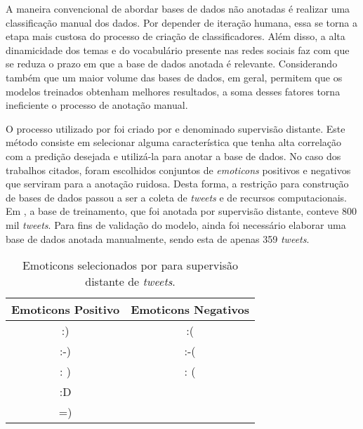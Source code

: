 A maneira convencional de abordar bases de dados não anotadas é realizar uma
classificação manual dos dados.
Por depender de iteração humana, essa se torna a etapa mais custosa do processo
de criação de classificadores.
Além disso, a alta dinamicidade dos temas e do vocabulário presente nas redes
sociais faz com que se reduza o prazo em que a base de dados anotada é
relevante.
Considerando também que um maior volume das bases de dados, em geral, permitem
que os modelos treinados obtenham melhores resultados, a soma desses fatores torna
ineficiente o processo de anotação manual.

O processo utilizado por \citet{go09} foi criado por \citet{read05} e denominado
supervisão distante.
Este método consiste em selecionar alguma característica que tenha alta correlação
com a predição desejada e utilizá-la para anotar a base de dados.
No caso dos trabalhos citados, foram escolhidos conjuntos de \textit{emoticons}
positivos e negativos que serviram para a anotação ruidosa.
Desta forma, a restrição para construção de bases de dados passou a ser a coleta
de \textit{tweets} e de recursos computacionais.
Em \citet{go09}, a base de treinamento, que foi anotada por supervisão distante,
conteve 800 mil \textit{tweets}.
Para fins de validação do modelo, ainda foi necessário elaborar uma base de
dados anotada manualmente, sendo esta de apenas 359 \textit{tweets}.

\begin{table}[h]
    \begin{center}
        \caption{Emoticons selecionados por \citet{go09} para supervisão
        distante de \textit{tweets}.}
        \begin{tabular}{| c c |}
        \hline
        \textbf{Emoticons Positivo} & \textbf{Emoticons Negativos} \\ \hline
        :)&:( \\
        :-)&:-(\\
        : )&: (\\
        :D& \\
        =)& \\ \hline
        \end{tabular}
        \label{tab:supervision_emoticons}
    \end{center}
\end{table}

